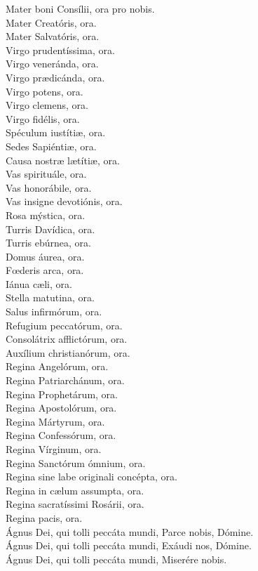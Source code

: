 \documentclass[10pt,a4paper,oneside]{book}
\begin{document}
\begin{minipage}[t]{0.475\textwidth}
      Mater boni Consílii, ora pro nobis.\\
      Mater Creatóris, ora.\\
      Mater Salvatóris, ora.\\
      Virgo prudentíssima, ora.\\
      Virgo veneránda, ora.\\
      Virgo pr{\ae}dicánda, ora.\\
      Virgo potens, ora.\\
      Virgo clemens, ora.\\
      Virgo fidélis, ora.\\
      Spéculum iustíti{\ae}, ora.\\
      Sedes Sapiénti{\ae}, ora.\\
      Causa nostr{\ae} l{\ae}títi{\ae}, ora.\\
      Vas spirituále, ora.\\
      Vas honorábile, ora.\\
      Vas insigne devotiónis, ora.\\
      Rosa mýstica, ora.\\
      Turris Davídica, ora.\\
      Turris ebúrnea, ora.\\
      Domus áurea, ora.\\
      F{\oe}deris arca, ora.\\
      Iánua c{\ae}li, ora.\\
      Stella matutina, ora.\\
      Salus infirmórum, ora.\\
      Refugium peccatórum, ora.\\
      Consolátrix afflictórum, ora.\\
      Auxílium christianórum, ora.\\
      Regina Angelórum, ora.\\
      Regina Patriarchánum, ora.\\
      Regina Prophetárum, ora.\\
      Regina Apostolórum, ora.\\
      Regina Mártyrum, ora.\\
      Regina Confessórum, ora.\\
      Regina Vírginum, ora.\\
      Regina Sanctórum ómnium, ora.\\
      Regina sine labe originali concépta, ora.\\
      Regina in c{\ae}lum assumpta, ora.\\
      Regina sacratíssimi Rosárii, ora.\\
      Regina pacis, ora.\\
      Ágnus Dei, qui tolli peccáta mundi, Parce nobis, Dómine.\\
      Ágnus Dei, qui tolli peccáta mundi, Exáudi nos, Dómine.\\
      Ágnus Dei, qui tolli peccáta mundi, Miserére nobis.\\
      \orapronobissalve\\


\end{minipage}
\end{document}
